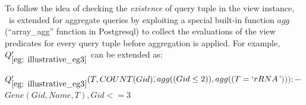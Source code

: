\begin{example}


To follow the idea of checking the {\em existence} of query tuple in the view instance, \rba\ is extended for aggregate queries by exploiting a special built-in function $agg$ (``array\_agg'' function in Postgresql) to collect the evaluations of the view predicates for every query tuple before aggregation is applied. For example, $Q_{\ref{eg: illustrative_eg3}}'$ can be extended as:
\begin{tabbing}
$Q_{\ref{eg: illustrative_eg3}}'(T, COUNT(Gid), $\hspace{0.1em}\=$ agg((Gid \leq 2)), agg((T = `rRNA$'$))):-$\\
\>$Gene(Gid, Name, T),Gid <= 3$
\end{tabbing}


\end{example}
